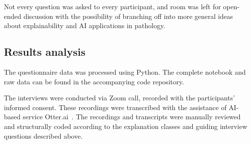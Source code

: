 Not every question was asked to every participant, and room was left for open-ended discussion with the possibility of branching off into more general ideas about explainability and AI applications in pathology.

\subsection{Results analysis}

The questionnaire data was processed using Python. The complete notebook and raw data can be found in the accompanying code repository.

The interviews were conducted via Zoom call, recorded with the participants' informed consent. These recordings were transcribed with the assistance of AI-based service Otter.ai~\cite{otterai-2021}. The recordings and transcripts were manually reviewed and structurally coded according to the explanation classes and guiding interview questions described above.